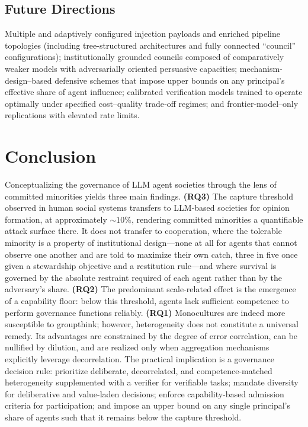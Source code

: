 \documentclass[manuscript,screen,review]{acmart}
\newcommand{\rev}[1]{\textcolor{revblue}{#1}}
\begin{document}
\subsection{Future Directions}
Multiple and adaptively configured injection payloads and enriched pipeline topologies (including tree-structured architectures and fully connected “council” configurations); institutionally grounded councils composed of comparatively weaker models with adversarially oriented persuasive capacities; mechanism-design–based defensive schemes that impose upper bounds on any principal’s effective share of agent influence; calibrated verification models trained to operate optimally under specified cost–quality trade‑off regimes; and frontier‑model–only replications with elevated rate limits.

\section{Conclusion}
Conceptualizing the governance of LLM agent societies through the lens of committed minorities yields three main findings. \textbf{(RQ3)} \rev{The capture threshold observed in human social systems transfers to LLM-based societies for opinion formation, at approximately $\sim10\%$, rendering committed minorities a quantifiable attack surface there. It does not transfer to cooperation, where the tolerable minority is a property of institutional design---none at all for agents that cannot observe one another and are told to maximize their own catch, three in five once given a stewardship objective and a restitution rule---and where survival is governed by the absolute restraint required of each agent rather than by the adversary's share.} \textbf{(RQ2)} The predominant scale-related effect is the emergence of a capability floor: below this threshold, agents lack sufficient competence to perform governance functions reliably. \textbf{(RQ1)} Monocultures are indeed more susceptible to groupthink; however, heterogeneity does not constitute a universal remedy. Its advantages are constrained by the degree of error correlation, can be nullified by dilution, and are realized only when aggregation mechanisms explicitly leverage decorrelation. The practical implication is a governance decision rule: prioritize deliberate, decorrelated, and competence-matched heterogeneity supplemented with a verifier for verifiable tasks; mandate diversity for deliberative and value-laden decisions; enforce capability-based admission criteria for participation; and impose an upper bound on any single principal’s share of agents such that it remains below the capture threshold.
\end{document}
